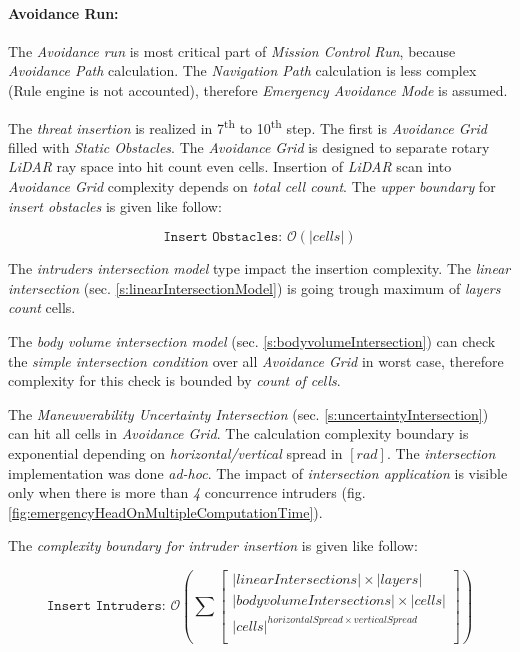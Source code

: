 \paragraph{Avoidance Run:} The \emph{Avoidance run} is most critical part of \emph{Mission Control Run}, because \emph{Avoidance Path} calculation. The \emph{Navigation Path} calculation is less complex (Rule engine is not accounted), therefore \emph{Emergency Avoidance Mode} is assumed. 

The \emph{threat insertion} is realized in 7\textsuperscript{th} to 10\textsuperscript{th} step. The first is \emph{Avoidance Grid} filled with \emph{Static Obstacles}. The \emph{Avoidance Grid} is designed to separate rotary  \emph{LiDAR} ray space into hit count even cells. Insertion of \emph{LiDAR} scan into \emph{Avoidance Grid} complexity depends on \emph{total cell count}. The \emph{upper boundary} for \emph{insert obstacles} is given like follow:

\begin{equation*}
    \texttt{Insert Obstacles: } \mathscr{O}(|cells|)
\end{equation*}

\noindent The \emph{intruders intersection model} type impact the insertion complexity. The \emph{linear intersection} (sec. \ref{s:linearIntersectionModel}) is going trough maximum of \emph{layers count} cells. 

The \emph{body volume intersection model} (sec. \ref{s:bodyvolumeIntersection}) can check the \emph{simple intersection condition} over all \emph{Avoidance Grid} in worst case, therefore complexity for this check is bounded by \emph{count of cells}. 

The \emph{Maneuverability Uncertainty Intersection} (sec. \ref{s:uncertaintyIntersection}) can hit all cells in \emph{Avoidance Grid}. The calculation complexity boundary is exponential depending on \emph{horizontal/vertical} spread in $[rad]$. The \emph{intersection} implementation was done \emph{ad-hoc}. The impact of \emph{intersection application} is visible only when there is more than \emph{4} concurrence intruders (fig. \ref{fig:emergencyHeadOnMultipleComputationTime}).

\noindent The \emph{complexity boundary for \emph{intruder insertion}} is given like follow:

\begin{equation*}
    \texttt{Insert Intruders: }
    \mathscr{O}\left(\sum \begin{bmatrix}
        |linear Intersections| \times |layers|\\
        |body volume Intersections| \times  |cells|\\
        |cells|^{horizontal Spread \times vertical Spread}\\
    \end{bmatrix}\right)
\end{equation*}

